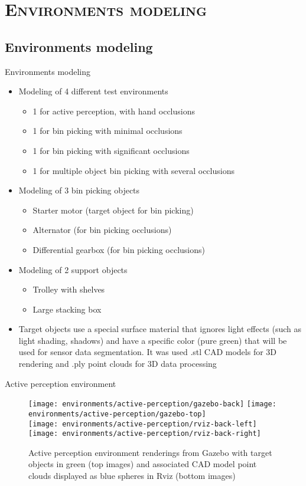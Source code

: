 \section{\scshape Environments modeling}
\subsection*{Environments modeling}
\begin{frame}{Environments modeling}
	\begin{itemize}
		\item Modeling of 4 different test environments
			\begin{itemize}
				\item 1 for active perception, with hand occlusions
				\item 1 for bin picking with minimal occlusions
				\item 1 for bin picking with significant occlusions
				\item 1 for multiple object bin picking with several occlusions
			\end{itemize}
		\item Modeling of 3 bin picking objects
		\begin{itemize}
			\item Starter motor (target object for bin picking)
			\item Alternator (for bin picking occlusions)
			\item Differential gearbox (for bin picking occlusions)
		\end{itemize}
		\item Modeling of 2 support objects
		\begin{itemize}
			\item Trolley with shelves
			\item Large stacking box
		\end{itemize}
		\item Target objects use a special surface material that ignores light effects (such as light shading, shadows) and have a specific color (pure green) that will be used for sensor data segmentation. It was used .stl CAD models for 3D rendering and .ply point clouds for 3D data processing
	\end{itemize}
\end{frame}


\begin{frame}{Active perception environment}
	\begin{figure}
		\centering
		\texttt{[image: environments/active-perception/gazebo-back]}
		\texttt{[image: environments/active-perception/gazebo-top]}\\
		\texttt{[image: environments/active-perception/rviz-back-left]}
		\texttt{[image: environments/active-perception/rviz-back-right]}
		\caption{Active perception environment renderings from Gazebo with target objects in green (top images) and associated CAD model point clouds displayed as blue spheres in Rviz (bottom images)}
	\end{figure}
\end{frame}


